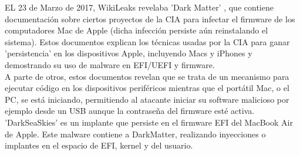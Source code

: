 EL 23 de Marzo de 2017, WikiLeaks revelaba 'Dark Matter' \cite{dark-matter}, que contiene documentación sobre ciertos proyectos de la CIA para infectar el firmware de los computadores Mac de Apple (dicha infección persiste aún reinstalando el sistema). Estos documentos explican los técnicas usadas por la CIA para ganar 'persistencia' en los dispositivos Apple, incluyendo Macs y iPhones y demostrando su uso de malware en EFI/UEFI y firmware. \\

A parte de otros, estos documentos revelan que se trata de un mecanismo para ejecutar código en los dispositivos periféricos mientras que el portátil Mac, o el PC, se está iniciando, permitiendo al atacante iniciar su software malicioso por ejemplo desde un USB aunque la contraseña del firmware esté activa. \\

'DarkSeaSkies' es un implante que persiste en el firmware EFI del MacBook Air de Apple. Este malware contiene a DarkMatter, realizando inyecciones o implantes en el espacio de EFI, kernel y del usuario. 

